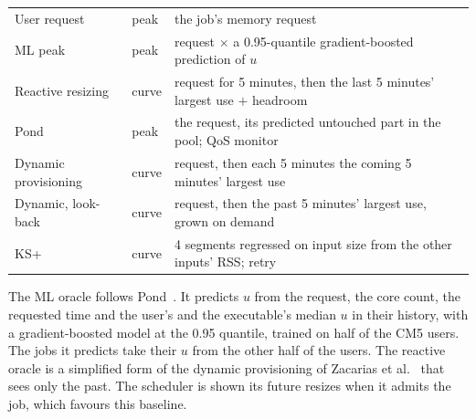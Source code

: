 \documentclass[11pt]{article}
\begin{document}
\begin{table}[t]
\begin{tabular}{lll}
User request & peak & the job's memory request \\
ML peak & peak & request $\times$ a 0.95-quantile gradient-boosted prediction of $u$ \\
Reactive resizing & curve & request for 5 minutes, then the last 5 minutes' largest use $+$ headroom \\
Pond & peak & the request, its predicted untouched part in the pool; QoS monitor \\
Dynamic provisioning & curve & request, then each 5 minutes the coming 5 minutes' largest use \\
Dynamic, look-back & curve & request, then the past 5 minutes' largest use, grown on demand \\
KS+ & curve & 4 segments regressed on input size from the other inputs' RSS; retry \\
\bottomrule
\end{tabular}
\end{table}

The ML oracle follows Pond~\cite{Li2023Pond}. It predicts $u$ from the request, the core count, the requested
time and the user's and the executable's median $u$ in their history, with a gradient-boosted model at the
0.95 quantile, trained on half of the CM5 users. The jobs it predicts take their $u$ from the other half of the
users. The reactive oracle is a simplified form of the dynamic provisioning of Zacarias et al.~\cite{Zacarias2023Dynamic}
that sees only the past. The scheduler is shown its future resizes when it admits the job, which favours this
baseline.
\end{document}
